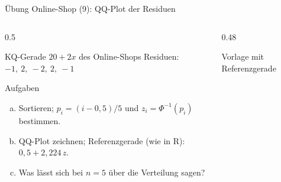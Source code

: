 \documentclass[aspectratio=169,11pt]{beamer}
\begin{document}
\begin{frame}{Übung Online-Shop (9): QQ-Plot der Residuen}
  \begin{columns}[T]
    \begin{column}{0.5\textwidth}
      \begin{block}{KQ-Gerade $20 + 2x$ des Online-Shops}
        Residuen: \ $-1,\ 2,\ -2,\ 2,\ -1$
      \end{block}
      \begin{exampleblock}{Aufgaben}
        \begin{enumerate}[a)]
          \setlength{\itemsep}{2pt}
          \item Sortieren; $p_i = (i - 0{,}5)/5$ und $z_i = \Phi^{-1}(p_i)$ bestimmen.
          \item QQ-Plot zeichnen; Referenzgerade (wie in R): $0{,}5 + 2{,}224\,z$.
          \item Was lässt sich bei $n = 5$ über die Verteilung sagen?
        \end{enumerate}
      \end{exampleblock}
    \end{column}
    \begin{column}{0.48\textwidth}
      \begin{center}\footnotesize Vorlage mit Referenzgerade\end{center}
    \end{column}
  \end{columns}
\end{frame}
\end{document}
